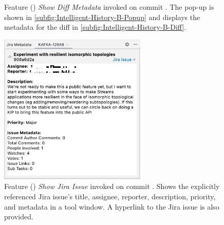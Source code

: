 \begin{figure}
    \centering
    \qquad
    \caption{
        Feature () \textit{Show Diff Metadata} invoked on commit . 
        The pop-up is shown in \autoref{subfig:Intelligent-History-B-Popup} 
        and displays the metadata for the diff in \autoref{subfig:Intelligent-History-B-Diff}.
    }
    \label{fig:Intelligent-History-B}%
\end{figure}

\begin{figure}
    \centering
    \includegraphics[width=7cm]{./images/intelligent-history-C.png}
    \caption{
        Feature () \textit{Show Jira Issue} invoked on commit .
        Shows the explicitly referenced Jira issue's title, assignee, reporter, description, priority, 
        and metadata in a tool window. A hyperlink to the Jira issue is also provided.
    }
    \label{fig:Intelligent-History-C}
\end{figure}

